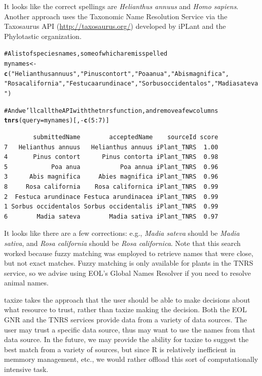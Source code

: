\documentclass[letterpaper,superscriptaddress,showkeys,longbibliography,10pt]{revtex4-1}\usepackage{graphicx, color}
\makeatletter
\newcommand{\hlfunctioncall}[1]{\textcolor[rgb]{0.501960784313725,0,0.329411764705882}{\textbf{#1}}}%
\newcommand{\hlstring}[1]{\textcolor[rgb]{0.6,0.6,1}{#1}}%
\newcommand{\hlcomment}[1]{\textcolor[rgb]{0.180392156862745,0.6,0.341176470588235}{#1}}%
\newenvironment{kframe}{%
 \def\at@end@of@kframe{}%
 \ifinner\ifhmode%
  \def\at@end@of@kframe{\end{minipage}}%
  \begin{minipage}{\columnwidth}%
 \fi\fi%
 \def\FrameCommand##1{\hskip\@totalleftmargin \hskip-\fboxsep
 \colorbox{shadecolor}{##1}\hskip-\fboxsep
     \hskip-\linewidth \hskip-\@totalleftmargin \hskip\columnwidth}%
 \MakeFramed {\advance\hsize-\width
   \@totalleftmargin\z@ \linewidth\hsize
   \@setminipage}}%
 {\par\unskip\endMakeFramed%
 \at@end@of@kframe}
\newenvironment{knitrout}{}{} %
\makeatother
\begin{document}
It looks like the correct spellings are \emph{Helianthus annuus} and \emph{Homo sapiens}. Another approach uses the Taxonomic Name Resolution Service via the Taxosaurus API (\url{http://taxosaurus.org/}) developed by iPLant and the Phylotastic organization.

\begin{knitrout}
\color{fgcolor}\begin{kframe}
\begin{alltt}
\hlcomment{# A list of species names, some of which are misspelled}
mynames <- \hlfunctioncall{c}(\hlstring{"Helianthus annuus"}, \hlstring{"Pinus contort"}, \hlstring{"Poa anua"}, \hlstring{"Abis magnifica"}, 
    \hlstring{"Rosa california"}, \hlstring{"Festuca arundinace"}, \hlstring{"Sorbus occidentalos"}, \hlstring{"Madia sateva"})

\hlcomment{# And we'll call the API with the tnrs function, and remove a few columns}
\hlfunctioncall{tnrs}(query = mynames)[, -\hlfunctioncall{c}(5:7)]
\end{alltt}
\begin{verbatim}
        submittedName        acceptedName    sourceId score
7   Helianthus annuus   Helianthus annuus iPlant_TNRS  1.00
4       Pinus contort      Pinus contorta iPlant_TNRS  0.98
5            Poa anua           Poa annua iPlant_TNRS  0.96
3      Abis magnifica     Abies magnifica iPlant_TNRS  0.96
8     Rosa california    Rosa californica iPlant_TNRS  0.99
2  Festuca arundinace Festuca arundinacea iPlant_TNRS  0.99
1 Sorbus occidentalos Sorbus occidentalis iPlant_TNRS  0.99
6        Madia sateva        Madia sativa iPlant_TNRS  0.97
\end{verbatim}
\end{kframe}
\end{knitrout}


It looks like there are a few corrections: e.g., \emph{Madia sateva} should be \emph{Madia sativa}, and \emph{Rosa california} should be \emph{Rosa californica}. Note that this search worked because fuzzy matching was employed to retrieve names that were close, but not exact matches. Fuzzy matching is only available for plants in the TNRS service, so we advise using EOL's Global Names Resolver if you need to resolve animal names.

taxize takes the approach that the user should be able to make decisions about what resource to trust, rather than taxize making the decision. Both the EOL GNR and the TNRS services provide data from a variety of data sources. The user may trust a specific data source, thus may want to use the names from that data source. In the future, we may provide the ability for taxize to suggest the best match from a variety of sources, but since R is relatively inefficient in memmory management, etc., we would rather offload this sort of computationally intensive task.
\end{document}
